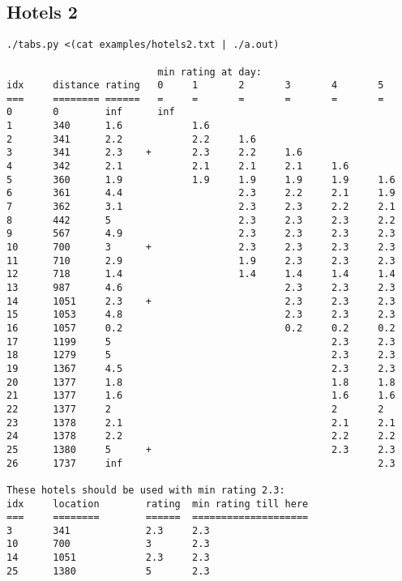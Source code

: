\documentclass[a4paper,10pt,ngerman]{scrartcl}
\begin{document}
\subsection*{Hotels 2}
\begin{lstlisting}
./tabs.py <(cat examples/hotels2.txt | ./a.out)

                          min rating at day:
idx     distance rating   0     1       2       3       4       5
===     ======== ======   =     =       =       =       =       =
0       0        inf      inf
1       340      1.6            1.6
2       341      2.2            2.2     1.6
3       341      2.3    +       2.3     2.2     1.6
4       342      2.1            2.1     2.1     2.1     1.6
5       360      1.9            1.9     1.9     1.9     1.9     1.6
6       361      4.4                    2.3     2.2     2.1     1.9
7       362      3.1                    2.3     2.3     2.2     2.1
8       442      5                      2.3     2.3     2.3     2.2
9       567      4.9                    2.3     2.3     2.3     2.3
10      700      3      +               2.3     2.3     2.3     2.3
11      710      2.9                    1.9     2.3     2.3     2.3
12      718      1.4                    1.4     1.4     1.4     1.4
13      987      4.6                            2.3     2.3     2.3
14      1051     2.3    +                       2.3     2.3     2.3
15      1053     4.8                            2.3     2.3     2.3
16      1057     0.2                            0.2     0.2     0.2
17      1199     5                                      2.3     2.3
18      1279     5                                      2.3     2.3
19      1367     4.5                                    2.3     2.3
20      1377     1.8                                    1.8     1.8
21      1377     1.6                                    1.6     1.6
22      1377     2                                      2       2
23      1378     2.1                                    2.1     2.1
24      1378     2.2                                    2.2     2.2
25      1380     5      +                               2.3     2.3
26      1737     inf                                            2.3

These hotels should be used with min rating 2.3:
idx     location        rating  min rating till here
===     ========        ======  ====================
3       341             2.3     2.3
10      700             3       2.3
14      1051            2.3     2.3
25      1380            5       2.3
\end{lstlisting}
\end{document}
